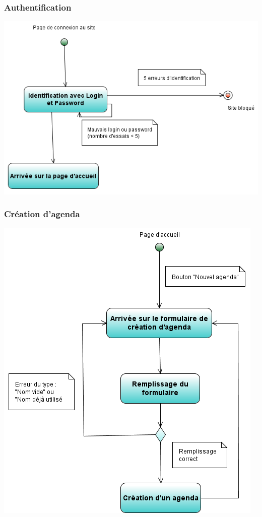 \documentclass[12pt , a4paper]{article}
\begin{document}
\subsubsection{Authentification}
\begin{center}
  \includegraphics[scale=0.6]{./images/diag_act_authentification.png}
\end{center}

\subsubsection{Création d'agenda}
\begin{center}
  \includegraphics[scale=0.6]{./images/diag_act_creation_agenda.png}
\end{center}
\end{document}

